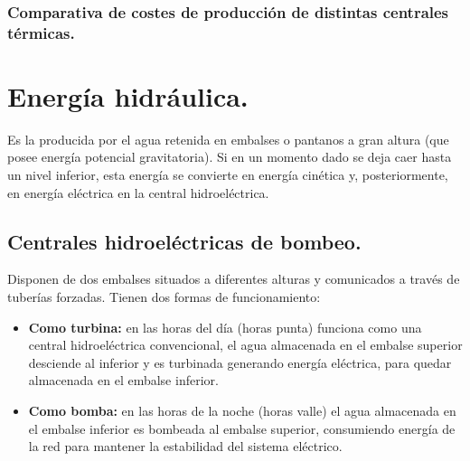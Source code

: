 		\subsubsection{Comparativa de costes de producción de distintas centrales térmicas.}
			\begin{center}
			\end{center}

\section{Energía hidráulica.}
		Es la producida por el agua retenida en embalses o pantanos a gran altura (que posee
		energía potencial gravitatoria). Si en un momento dado se deja caer hasta un nivel inferior, esta energía se
		convierte en energía cinética y, posteriormente, en energía eléctrica en la central hidroeléctrica.
		
	\subsection{Centrales hidroeléctricas de bombeo.}
		Disponen de dos embalses situados a diferentes alturas y comunicados a través de tuberías forzadas. Tienen dos formas de funcionamiento:
		\begin{itemize}
			\item \textbf{Como turbina:} en las horas del día (horas punta) funciona como una central hidroeléctrica
			convencional, el agua almacenada en el embalse superior desciende al inferior y es turbinada
			generando energía eléctrica, para quedar almacenada en el embalse inferior.
			
			\item \textbf{Como bomba:} en las horas de la noche (horas valle) el agua almacenada en el embalse inferior
			es bombeada al embalse superior, consumiendo energía de la red para mantener la estabilidad del
			sistema eléctrico.
		\end{itemize}